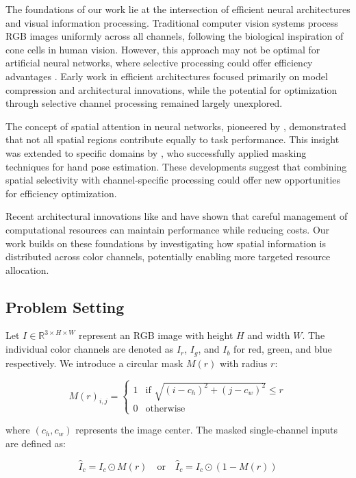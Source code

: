 \documentclass{article} %
\begin{document}
The foundations of our work lie at the intersection of efficient neural architectures and visual information processing. Traditional computer vision systems process RGB images uniformly across all channels, following the biological inspiration of cone cells in human vision. However, this approach may not be optimal for artificial neural networks, where selective processing could offer efficiency advantages \citep{Howard2017MobileNetsEC}. Early work in efficient architectures focused primarily on model compression and architectural innovations, while the potential for optimization through selective channel processing remained largely unexplored.

The concept of spatial attention in neural networks, pioneered by \citep{Jaderberg2015SpatialTN}, demonstrated that not all spatial regions contribute equally to task performance. This insight was extended to specific domains by \citep{wang2018mask}, who successfully applied masking techniques for hand pose estimation. These developments suggest that combining spatial selectivity with channel-specific processing could offer new opportunities for efficiency optimization.

Recent architectural innovations like \citep{Sandler2018MobileNetV2IR} and \citep{Zhang2017ShuffleNetAE} have shown that careful management of computational resources can maintain performance while reducing costs. Our work builds on these foundations by investigating how spatial information is distributed across color channels, potentially enabling more targeted resource allocation.

\subsection{Problem Setting}
Let $I \in \mathbb{R}^{3 \times H \times W}$ represent an RGB image with height $H$ and width $W$. The individual color channels are denoted as $I_r$, $I_g$, and $I_b$ for red, green, and blue respectively. We introduce a circular mask $M(r)$ with radius $r$:

\[
M{(r)}_{i,j} = \begin{cases} 
1 & \text{if } \sqrt{{(i-c_h)}^2 + {(j-c_w)}^2} \leq r \\
0 & \text{otherwise}
\end{cases}
\]

where $(c_h, c_w)$ represents the image center. The masked single-channel inputs are defined as:

\[
\hat{I}_c = I_c \odot M(r) \quad \text{or} \quad \hat{I}_c = I_c \odot (1-M(r))
\]
\end{document}
